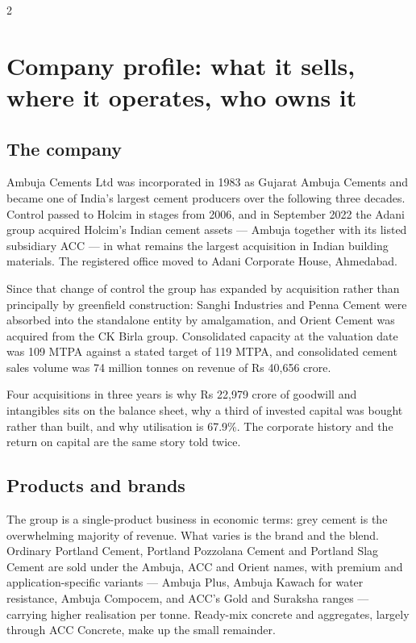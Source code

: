 \begin{paracol}{2}

\switchcolumn*
\section{Company profile: what it sells, where it operates, who owns it}

\subsection{The company}

Ambuja Cements Ltd was incorporated in 1983 as Gujarat Ambuja Cements and became
one of India's largest cement producers over the following three decades. Control
passed to Holcim in stages from 2006, and in September 2022 the Adani group acquired
Holcim's Indian cement assets — Ambuja together with its listed subsidiary ACC — in
what remains the largest acquisition in Indian building materials. The registered
office moved to Adani Corporate House, Ahmedabad.

Since that change of control the group has expanded by acquisition rather than
principally by greenfield construction: Sanghi Industries and Penna Cement were
absorbed into the standalone entity by amalgamation, and Orient Cement was acquired
from the CK Birla group. Consolidated capacity at the valuation date was 109 MTPA
against a stated target of 119 MTPA, and consolidated cement sales volume was
74 million tonnes on revenue of Rs 40,656 crore.

\begin{keybox}
Four acquisitions in three years is why Rs 22,979 crore of goodwill and intangibles
sits on the balance sheet, why a third of invested capital was bought rather than
built, and why utilisation is 67.9\%. The corporate history and the return on capital
are the same story told twice.
\end{keybox}

\subsection{Products and brands}

The group is a single-product business in economic terms: grey cement is the
overwhelming majority of revenue. What varies is the brand and the blend. Ordinary
Portland Cement, Portland Pozzolana Cement and Portland Slag Cement are sold under
the Ambuja, ACC and Orient names, with premium and application-specific variants —
Ambuja Plus, Ambuja Kawach for water resistance, Ambuja Compocem, and ACC's Gold and
Suraksha ranges — carrying higher realisation per tonne. Ready-mix concrete and
aggregates, largely through ACC Concrete, make up the small remainder.


\end{paracol}

